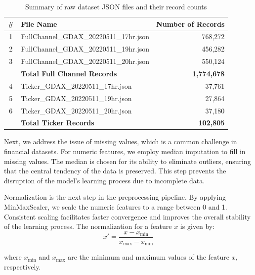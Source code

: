\documentclass[conference]{IEEEtran}
\begin{document}
\begin{table}[H]
    \centering
    \caption{Summary of raw dataset JSON files and their record counts}
    \label{table:json_files}
    \vspace{0.5cm}
    \begin{tabular}{|c|l|r|}
        \hline
        \textbf{\#} & \textbf{File Name} & \textbf{Number of Records} \\
        \hline
        1 & FullChannel\_GDAX\_20220511\_17hr.json & 768,272 \\
        \hline
        2 & FullChannel\_GDAX\_20220511\_19hr.json & 456,282 \\
        \hline
        3 & FullChannel\_GDAX\_20220511\_20hr.json & 550,124 \\
        \hline
         & \textbf{Total Full Channel Records} & \textbf{1,774,678} \\
        \hline
        4 & Ticker\_GDAX\_20220511\_17hr.json & 37,761 \\
        \hline
        5 & Ticker\_GDAX\_20220511\_19hr.json & 27,864 \\
        \hline
        6 & Ticker\_GDAX\_20220511\_20hr.json & 37,180 \\
        \hline
        & \textbf{Total Ticker Records} & \textbf{102,805} \\
        \hline
    \end{tabular}
\end{table}

\par Next, we address the issue of missing values, which is a common challenge in financial datasets. For numeric features, we employ median imputation to fill in missing values. The median is chosen for its ability to eliminate outliers, ensuring that the central tendency of the data is preserved. This step prevents the disruption of the model's learning process due to incomplete data.

\par Normalization is the next step in the preprocessing pipeline. By applying MinMaxScaler, we scale the numeric features to a range between 0 and 1. Consistent scaling facilitates faster convergence and improves the overall stability of the learning process. The normalization for a feature $x$ is given by:
\begin{equation}
x' = \frac{x - x_{\min}}{x_{\max} - x_{\min}}
\end{equation}

where $x_{\min}$ and $x_{\max}$ are the minimum and maximum values of the feature $x$, respectively.
\end{document}
